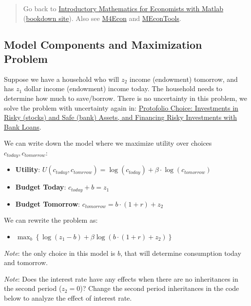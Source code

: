 \documentclass[
]{book}
\providecommand{\tightlist}{%
  \setlength{\itemsep}{0pt}\setlength{\parskip}{0pt}}
\begin{document}
\begin{quote}
Go back to \href{https://math4econ.github.io/}{Introductory Mathematics for Economists with Matlab} (\href{https://math4econ.github.io/bookdown}{bookdown site}). Also see \href{http://fanwangecon.github.io/M4Econ}{M4Econ} and \href{https://fanwangecon.github.io/MEconTools/}{MEconTools}.
\end{quote}

\hypertarget{model-components-and-maximization-problem}{%
\subsection{Model Components and Maximization Problem}\label{model-components-and-maximization-problem}}

Suppose we have a household who will \(z_2\) income (endowment) tomorrow,
and has \(z_1\) dollar income (endowment) income today. The household
needs to determine how much to save/borrow. There is no uncertainty in
this problem, we solve the problem with uncertainty again in:
\href{https://math4econ.github.io/uncertainty/RiskyAsset.html}{Protofolio Choice: Investments in Risky (stocks) and Safe (bank)
Assets, and Financing Risky Investments with Bank
Loans}.

We can write down the model where we maximize utility over choices
\(c_{today} ,c_{tomorrow}\):

\begin{itemize}
\item
  \textbf{Utility}:
  \(U(c_{today} ,c_{tomrrow} )=\log (c_{today} )+\beta \cdot \log (c_{tomorrow} )\)
\item
  \textbf{Budget Today}: \(c_{today} +b=z_1\)
\item
  \textbf{Budget Tomorrow}: \(c_{tomorrow} =b\cdot (1+r)+z_2\)
\end{itemize}

We can rewrite the problem as:

\begin{itemize}
\tightlist
\item
  \(\displaystyle \max_b \left\lbrace \log (z_1 -b)+\beta \log (b\cdot (1+r)+z_2 )\right\rbrace\)
\end{itemize}

\emph{Note}: the only choice in this model is \(b\), that will determine
consumption today and tomorrow.

\emph{Note}: Does the interest rate have any effects when there are no
inheritances in the second period (\(z_2 =0\))? Change the second period
inheritances in the code below to analyze the effect of interest rate.
\end{document}
